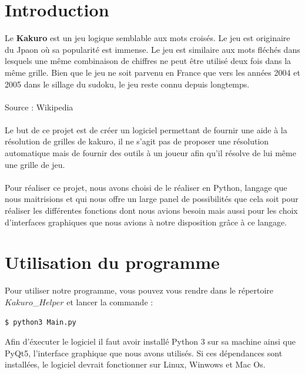 \documentclass[12pt]{article}
\begin{document}
\tableofcontents
\newpage


\section{Introduction}
Le \textbf{Kakuro} est un jeu logique semblable aux mots croisés. Le jeu est originaire du Jpaon où sa popularité est immense. Le jeu est similaire aux mots fléchés dans lesquels une même combinaison de chiffres ne peut être utilisé deux fois dans la même grille. Bien que le jeu ne soit parvenu en France que vers les années 2004 et 2005 dans le sillage du sudoku, le jeu reste connu depuis longtemps. \\ \\ Source : Wikipedia \\ \\
Le but de ce projet est de créer un logiciel permettant de fournir une aide à la résolution de grilles de kakuro, il ne s'agit pas de proposer une résolution automatique mais de fournir des outils à un joueur afin qu'il résolve de lui même une grille de jeu. \\\ \\
Pour réaliser ce projet, nous avons choisi de le réaliser en Python, langage que nous maitrisions et qui nous offre un large panel de possibilités que cela soit pour réaliser les différentes fonctions dont nous avions besoin mais aussi pour les choix d'interfaces graphiques que nous avions à notre disposition grâce à ce langage. 
\section{Utilisation du programme}
Pour utiliser notre programme, vous pouvez vous rendre dans le répertoire $Kakuro$\_$Helper$ et lancer la commande :
\begin{lstlisting}[language=bash]
  $ python3 Main.py
\end{lstlisting}
Afin d'éxecuter le logiciel il faut avoir installé Python 3 sur sa machine ainsi que PyQt5, l'interface graphique que nous avons utilisés. Si ces dépendances sont installées, le logiciel devrait fonctionner sur Linux, Winwows et Mac Os.

\newpage
\end{document}

